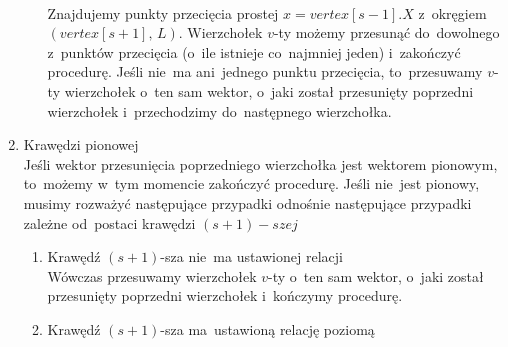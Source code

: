 \documentclass[11pt, a4paper]{article}
\begin{document}
\begin{enumerate}
\begin{enumerate}
 \\
      Znajdujemy punkty przecięcia prostej $x = vertex[s-1].X$ z~okręgiem $(vertex[s+1],\, L)$. Wierzchołek $v$-ty możemy
      przesunąć do~dowolnego z~punktów przecięcia (o~ile istnieje co~najmniej jeden) i~zakończyć procedurę.
      Jeśli nie~ma ani~jednego punktu przecięcia, to~przesuwamy $v$-ty wierzchołek o~ten sam wektor, o~jaki został przesunięty
      poprzedni wierzchołek i~przechodzimy do~następnego wierzchołka. \\
      
    \end{enumerate}
    \item Krawędzi pionowej \\
    Jeśli wektor przesunięcia poprzedniego wierzchołka jest wektorem pionowym, to~możemy w~tym momencie zakończyć procedurę.
    Jeśli nie~jest pionowy, musimy rozważyć następujące przypadki odnośnie następujące przypadki zależne od~postaci krawędzi
    $(s+1)-szej$
    \begin{enumerate}
     \item Krawędź $(s+1)$-sza nie~ma ustawionej relacji \\
     Wówczas przesuwamy wierzchołek $v$-ty o~ten sam wektor, o~jaki został przesunięty poprzedni wierzchołek i~kończymy procedurę.
     \item Krawędź $(s+1)$-sza ma~ustawioną relację poziomą \\
\end{enumerate}
\end{enumerate}
\end{document}
